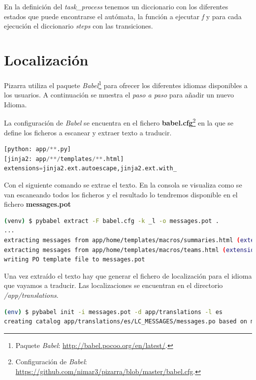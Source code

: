\documentclass[11pt,spanish,listoffigures,listoftables]{tfgetsinf}
\begin{document}
En la definición del \textit{task\_process} tenemos un diccionario con los diferentes estados que puede encontrarse el autómata, la función a ejecutar \textit{f} y para cada ejecución el diccionario \textit{steps} con las transiciones.

\section{Localización}

Pizarra utiliza el \Gls{paquete} \textit{Babel}\footnote{Paquete \textit{Babel}: \url{http://babel.pocoo.org/en/latest/}.} para ofrecer los diferentes idiomas disponibles a los usuarios. A continuación se muestra el \textit{paso a paso} para añadir un nuevo Idioma.

La configuración de \textit{Babel} se encuentra en el fichero \textbf{babel.cfg}\footnote{Configuración de \textit{Babel}: \url{https://github.com/nimar3/pizarra/blob/master/babel.cfg}.} en la que se define los ficheros a escanear y extraer texto a traducir.

\begin{lstlisting}[language=python]
[python: app/**.py]
[jinja2: app/**/templates/**.html]
extensions=jinja2.ext.autoescape,jinja2.ext.with_
\end{lstlisting}

Con el siguiente comando se extrae el texto. En la consola se visualiza como se van escaneando todos los ficheros y el resultado lo tendremos disponible en el fichero \mbox{\textbf{messages.pot}} 

\begin{lstlisting}[language=bash]
(venv) $ pybabel extract -F babel.cfg -k _l -o messages.pot .
...
extracting messages from app/home/templates/macros/summaries.html (extensions="jinja2.ext.autoescape,jinja2.ext.with_")
extracting messages from app/home/templates/macros/teams.html (extensions="jinja2.ext.autoescape,jinja2.ext.with_")
writing PO template file to messages.pot
\end{lstlisting}

Una vez extraído el texto hay que generar el fichero de localización para el idioma que vayamos a traducir. Las localizaciones se encuentran en el directorio \textit{/app/translations}. 

\begin{lstlisting}[language=bash]
(env) $ pybabel init -i messages.pot -d app/translations -l es
creating catalog app/translations/es/LC_MESSAGES/messages.po based on messages.pot
\end{lstlisting}
\end{document}
